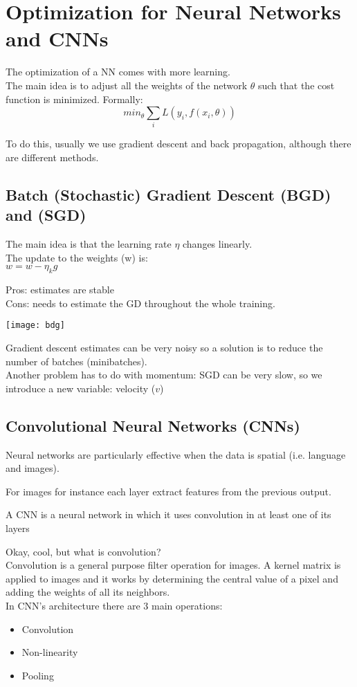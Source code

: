 \chapter{Optimization for Neural Networks and CNNs}
The optimization of a NN comes with more learning. \\
The main idea is to adjust all the weights of the network $\theta$ such that the cost function is minimized. Formally:\\
\[
min_\theta \sum_i L(y_i, f(x_i, \theta))
\]

To do this, usually we use gradient descent and back propagation, although there are different methods. 
\section{Batch (Stochastic) Gradient Descent (BGD) and (SGD) }
The main idea is that the learning rate $\eta$ changes linearly. \\
The update to the weights (w) is: \\
$w = w - \eta_k g$

Pros: estimates are stable \\
Cons: needs to estimate the GD throughout the whole training.

\texttt{[image: bdg]}

Gradient descent estimates can be very noisy so a solution is to reduce the number of batches (minibatches).\\
Another problem has to do with momentum: SGD can be very slow, so we introduce a new variable: velocity ($v$)

\section{Convolutional Neural Networks (CNNs)}
Neural networks are particularly effective when the data is spatial (i.e. language and images).

For images for instance each layer extract features from the previous output. 
\begin{definition}
	A CNN is a neural network in which it uses convolution in at least one of its layers
\end{definition}
Okay, cool, but what is convolution? \\
Convolution is a general purpose filter operation for images. A kernel matrix is applied to images and it works by determining the central value of a pixel and adding the weights of all its neighbors.\\
In CNN's architecture there are 3 main operations:
\begin{itemize}
	\item Convolution
	\item Non-linearity
	\item Pooling
\end{itemize}

